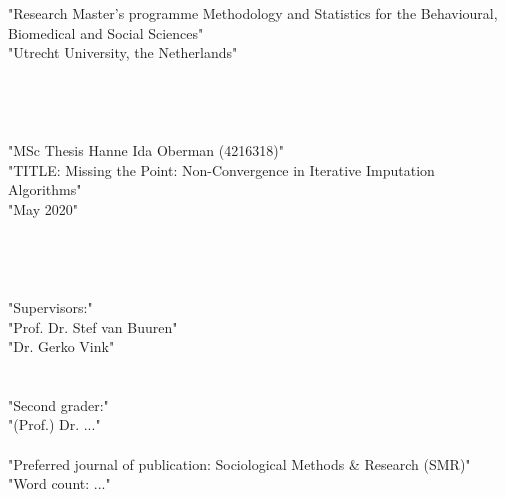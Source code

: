 \begin{large}
\vspace{\baselineskip}
\vspace{\baselineskip}
\noindent "Research Master's programme Methodology and Statistics for the Behavioural, Biomedical and Social Sciences" \\
"Utrecht University, the Netherlands" \\
\\
\\
\\
\\
"MSc Thesis Hanne Ida Oberman (4216318)" \\
"TITLE: Missing the Point: Non-Convergence in Iterative Imputation Algorithms" \\
"May 2020" \\
\\
\\
\\
\\
"Supervisors:" \\
"Prof. Dr. Stef van Buuren" \\
"Dr. Gerko Vink" \\
\\
\\
"Second grader:" \\
"(Prof.) Dr. ..." \\
\\
"Preferred journal of publication: Sociological Methods \& Research (SMR)" \\
"Word count: ..." \\
\pagebreak
\end{large}

